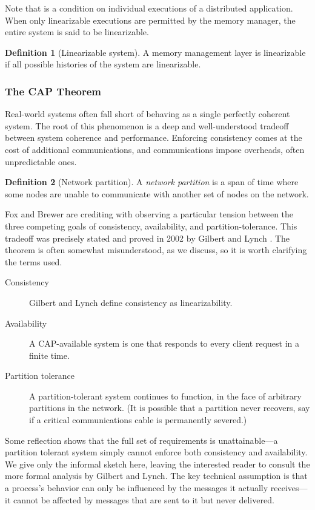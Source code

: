 \documentclass[]             %
{NASA}                       %
\theoremstyle{definition}
\newtheorem{definition}{Definition}[section]
\begin{document}
Note that is a condition on individual executions of a distributed
application. When only linearizable executions are permitted by the
memory manager, the entire system is said to be linearizable.

\begin{definition}[Linearizable system]
  A memory management layer is linearizable if all possible histories
  of the system are linearizable.
\end{definition}

\subsubsection{The CAP Theorem}
Real-world systems often fall short of behaving as a single perfectly
coherent system. The root of this phenomenon is a deep and
well-understood tradeoff between system coherence and performance.
Enforcing consistency comes at the cost of additional communications,
and communications impose overheads, often unpredictable ones.

\begin{definition}[Network partition]
  A \emph{network partition} is a span of time where some nodes are
  unable to communicate with another set of nodes on the network.
\end{definition}

Fox and Brewer \cite{1999foxbrewer} are crediting with observing a
particular tension between the three competing goals of consistency,
availability, and partition-tolerance. This tradeoff was precisely
stated and proved in 2002 by Gilbert and Lynch
\cite{2002gilbertlynchCAP}.  The theorem is often somewhat
misunderstood, as we discuss, so it is worth clarifying the terms
used.

\begin{description}
\item[Consistency] Gilbert and Lynch define consistency as linearizability.
\item[Availability] A CAP-available system is one that responds to
  every client request in a finite time.
\item[Partition tolerance] A partition-tolerant system continues to
  function, in the face of arbitrary partitions in the network. (It is
  possible that a partition never recovers, say if a critical
  communications cable is permanently severed.)
\end{description}

Some reflection shows that the full set of requirements is
unattainable---a partition tolerant system simply cannot enforce both
consistency and availability. We give only the informal sketch here,
leaving the interested reader to consult the more formal analysis by
Gilbert and Lynch. The key technical assumption is that a process's
behavior can only be influenced by the messages it actually
receives---it cannot be affected by messages that are sent to it but
never delivered.
\end{document}

